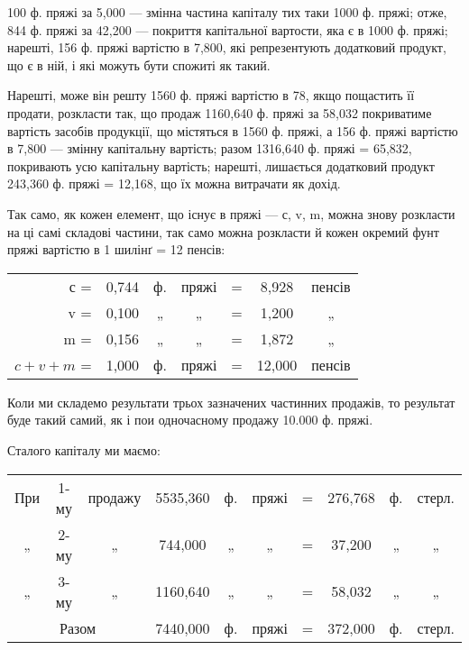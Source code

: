 \parcont{}  %
100 ф. пряжі за 5,000 — змінна частина капіталу тих таки
1000 ф. пряжі; отже, 844 ф. пряжі за 42,200 — покриття
капітальної вартости, яка є в 1000 ф. пряжі; нарешті, 156 ф. пряжі
вартістю в 7,800, які репрезентують додатковий продукт, що
є в ній, і які можуть бути спожиті як такий.

Нарешті, може він решту 1560 ф. пряжі вартістю в 78,
якщо пощастить її продати, розкласти так, що продаж 1160,640 ф.
пряжі за 58,032 покриватиме вартість засобів продукції, що
містяться в 1560 ф. пряжі, а 156 ф. пряжі вартістю в 7,800 —
змінну капітальну вартість; разом 1316,640 ф. пряжі = 65,832,
покривають усю капітальну вартість; нарешті, лишається додатковий
продукт 243,360 ф. пряжі = 12,168, що їх можна витрачати як
дохід.

Так само, як кожен елемент, що існує в пряжі — с, v, m, можна
знову розкласти на ці самі складові частини, так само можна розкласти й
кожен окремий фунт пряжі вартістю в 1 шилінґ = 12 пенсів:
\begin{table}[h]
\centering
\setlength{\tabcolsep}{2pt}
\begin{tabularx}{\textwidth}{r c c c c c c}

с = & 0,744 & ф. & пряжі & = & 8,928 & пенсів \\
v = & 0,100 & „ & „ & = & 1,200 & „ \\
m = & 0,156 & „ & „ & = & 1,872 & „ \\
\cmidrule{1-7}
$c + v + m$  = & 1,000 & ф. & пряжі & = & 12,000 & пенсів \\
\end{tabularx}
\end{table}
Коли ми складемо результати трьох зазначених частинних продажів, то
результат буде такий самий, як і пои одночасному продажу \num{10.000} ф.
пряжі.

Сталого капіталу ми маємо:

\begin{table}[h]
  \setlength{\tabcolsep}{2pt}
  \begin{tabularx}{\textwidth}{c c c c c c c c c c}
    При & 1-му & продажу & 5535,360 & ф. & пряжі & = & 276,768 & ф. & стерл.\\
    „ & 2-му & „ & 744,000 & „ & „ & = & 37,200 & „ & „\\
    „ & 3-му & „ & 1160,640 & „ & „ & = & 58,032 & „ & „\\
    \cmidrule{1-10}
    \multicolumn{3}{c}{Разом} & 7440,000 & ф. & пряжі & = & 372,000 & ф. & стерл.\\
\end{tabularx}
\end{table}

